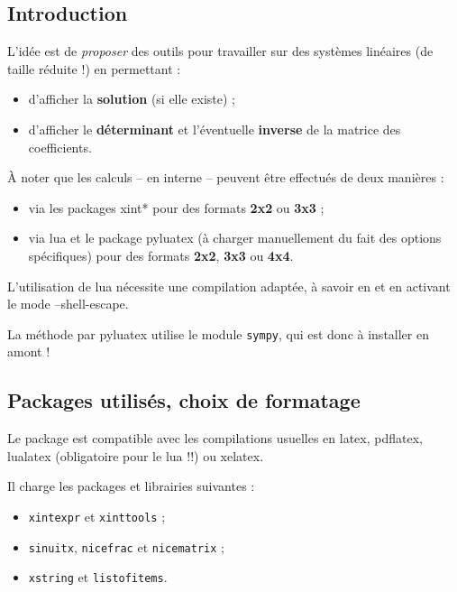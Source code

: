 \documentclass[a4paper,11pt]{article}
\begin{document}
\subsection{Introduction}

L'idée est de \textit{proposer} des outils pour travailler sur des systèmes linéaires (de taille réduite !) en permettant :

\begin{itemize}
	\item d'afficher la \textbf{solution} (si elle existe) ;
	\item d'afficher le \textbf{déterminant} et l'éventuelle \textbf{inverse} de la matrice des coefficients.
\end{itemize}

À noter que les calculs -- en interne -- peuvent être effectués de deux manières :

\begin{itemize}
	\item via les packages \textsf{xint*} pour des formats \textbf{2x2} ou \textbf{3x3} ;
	\item via \textsf{lua} et le package \textsf{pyluatex} (à charger manuellement du fait des options spécifiques) pour des formats \textbf{2x2}, \textbf{3x3} ou \textbf{4x4}.
\end{itemize}

L'utilisation de \textsf{lua} nécessite une compilation adaptée, à savoir en  et en activant le mode \textsf{--shell-escape}.

\smallskip

La méthode par \textsf{pyluatex} utilise le module \texttt{sympy}, qui est donc à installer en amont !

\subsection{Packages utilisés, choix de formatage}

Le package est compatible avec les compilations usuelles en \textsf{latex}, \textsf{pdflatex}, \textsf{lualatex} (obligatoire pour le \textsf{lua} !!) ou \textsf{xelatex}.

\medskip

Il charge les packages et librairies suivantes :

\begin{itemize}
	\item \texttt{xintexpr} et \texttt{xinttools} ;
	\item \texttt{sinuitx}, \texttt{nicefrac} et \texttt{nicematrix} ;
	\item \texttt{xstring} et \texttt{listofitems}.
\end{itemize}
\end{document}
